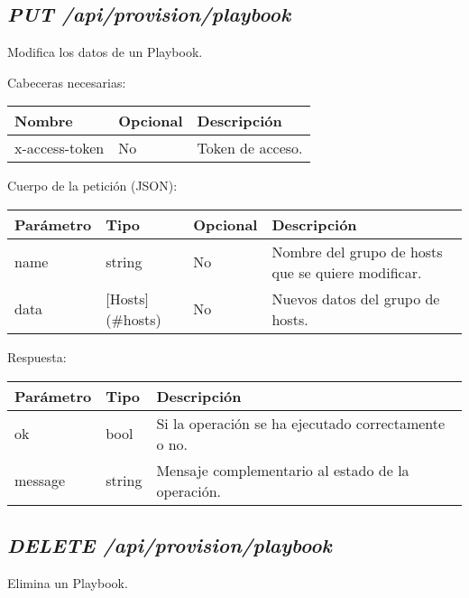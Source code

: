 	
	\subsection{\textit{PUT /api/provision/playbook}}
		Modifica los datos de un Playbook.
		
		Cabeceras necesarias:
		\begin{table}[h!]
			\centering
	\begin{adjustbox}{max width=\textwidth}
			\begin{tabular}{|l|l|l|}
				\hline
				Nombre & Opcional & Descripción \\ \hline
				x-access-token & No & Token de acceso. \\ \hline
			\end{tabular}
\end{adjustbox}
		\end{table}
		
		Cuerpo de la petición (JSON):
		\begin{table}[!h]
			\centering
	\begin{adjustbox}{max width=\textwidth}
			\begin{tabular}{|l|l|l|l|}
				\hline
				Parámetro & Tipo & Opcional & Descripción \\ \hline
				name & string & No & Nombre del grupo de hosts que se quiere modificar. \\ \hline
				data & [Hosts](\#hosts) & No & Nuevos datos del grupo de hosts. \\ \hline
			\end{tabular}
\end{adjustbox}
		\end{table}
		
		
		Respuesta:
		\begin{table}[!h]
			\centering
	\begin{adjustbox}{max width=\textwidth}
			\begin{tabular}{|l|l|l|}
				\hline
				Parámetro & Tipo & Descripción \\ \hline
				ok & bool & Si la operación se ha ejecutado correctamente o no. \\ \hline
				message & string & Mensaje complementario al estado de la operación. \\ \hline
			\end{tabular}
\end{adjustbox}
		\end{table}
	
	\subsection{\textit{DELETE /api/provision/playbook}}
		Elimina un Playbook.
		
